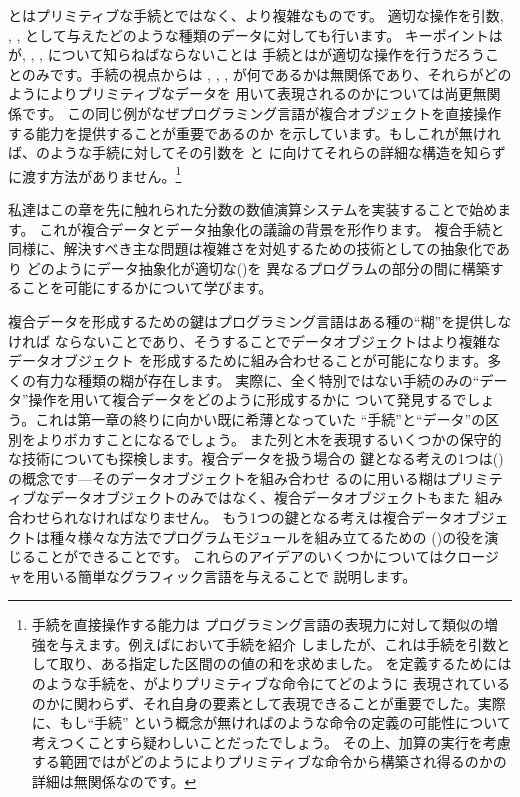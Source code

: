 \noindent
{}とはプリミティブな手続\code{+}と\code{*}ではなく、より複雑なものです。
適切な操作を引数, , , として与えたどのような種類のデータに対しても行います。
キーポイントはが, , , について知らねばならないことは
手続とはが適切な操作を行うだろうことのみです。手続の視点からは
, , , が何であるかは無関係であり、それらがどのようによりプリミティブなデータを
用いて表現されるのかについては尚更無関係です。
この同じ例がなぜプログラミング言語が複合オブジェクトを直接操作する能力を提供することが重要であるのか
を示しています。もしこれが無ければ、のような手続に対してその引数を と
に向けてそれらの詳細な構造を知らずに渡す方法がありません。\footnote{手続を直接操作する能力は
プログラミング言語の表現力に対して類似の増強を与えます。例えばにおいて手続を紹介
しましたが、これは手続を引数として取り、ある指定した区間のの値の和を求めました。
を定義するためにはのような手続を、がよりプリミティブな命令にてどのように
表現されているのかに関わらず、それ自身の要素として表現できることが重要でした。実際に、もし``手続''
という概念が無ければのような命令の定義の可能性について考えつくことすら疑わしいことだったでしょう。
その上、加算の実行を考慮する範囲ではがどのようによりプリミティブな命令から構築され得るのかの
詳細は無関係なのです。}



私達はこの章を先に触れられた分数の数値演算システムを実装することで始めます。
これが複合データとデータ抽象化の議論の背景を形作ります。
複合手続と同様に、解決すべき主な問題は複雑さを対処するための技術としての抽象化であり
どのようにデータ抽象化が適切な()を
異なるプログラムの部分の間に構築することを可能にするかについて学びます。



複合データを形成するための鍵はプログラミング言語はある種の``糊''を提供しなければ
ならないことであり、そうすることでデータオブジェクトはより複雑なデータオブジェクト
を形成するために組み合わせることが可能になります。多くの有力な種類の糊が存在します。
実際に、全く特別ではない手続のみの``データ''操作を用いて複合データをどのように形成するかに
ついて発見するでしょう。これは第一章の終りに向かい既に希薄となっていた
``手続''と``データ''の区別をよりボカすことになるでしょう。
また列と木を表現するいくつかの保守的な技術についても探検します。複合データを扱う場合の
鍵となる考えの1つは()の概念です---そのデータオブジェクトを組み合わせ
るのに用いる糊はプリミティブなデータオブジェクトのみではなく、複合データオブジェクトもまた
組み合わせられなければなりません。
もう1つの鍵となる考えは複合データオブジェクトは種々様々な方法でプログラムモジュールを組み立てるための
()の役を演じることができることです。
これらのアイデアのいくつかについてはクロージャを用いる簡単なグラフィック言語を与えることで
説明します。


